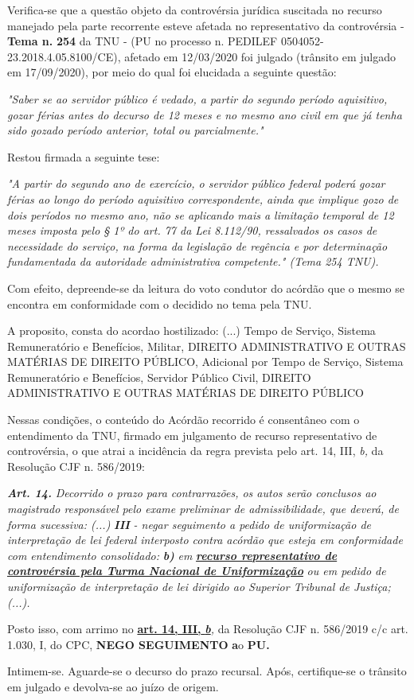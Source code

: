 \documentclass[12pt]{article}
\begin{document}
\justifying
\noindent Verifica-se que a questão objeto da controvérsia jurídica suscitada no recurso manejado pela parte recorrente esteve afetada no representativo da controvérsia - \textbf{Tema n. }\textbf{254} da TNU - (PU no processo n. PEDILEF 0504052-23.2018.4.05.8100/CE),  afetado em 12/03/2020 foi julgado (trânsito em julgado em 17/09/2020), por meio do qual foi elucidada a seguinte questão:

\noindent \textit{"Saber se ao servidor público é vedado, a partir do segundo período aquisitivo, gozar férias antes do decurso de 12 meses e no mesmo ano civil em que já tenha sido gozado período anterior, total ou parcialmente."}

\noindent Restou firmada a seguinte tese:

\noindent \textit{"A partir do segundo ano de exercício, o servidor público federal poderá gozar férias ao longo do período aquisitivo correspondente, ainda que implique gozo de dois períodos no mesmo ano, não se aplicando mais a limitação temporal de 12 meses imposta pelo § 1º do art. 77 da Lei 8.112/90, ressalvados os casos de necessidade do serviço, na forma da legislação de regência e por determinação fundamentada da autoridade administrativa competente." (Tema 254 TNU).}

\noindent Com efeito, depreende-se da leitura do voto condutor do acórdão que o mesmo se encontra em conformidade com o decidido no  tema pela TNU.

\noindent A proposito, consta do acordao hostilizado: (...) Tempo de Serviço, Sistema Remuneratório e Benefícios, Militar, DIREITO ADMINISTRATIVO E OUTRAS MATÉRIAS DE DIREITO PÚBLICO, Adicional por Tempo de Serviço, Sistema Remuneratório e Benefícios, Servidor Público Civil, DIREITO ADMINISTRATIVO E OUTRAS MATÉRIAS DE DIREITO PÚBLICO

\noindent Nessas condições, o conteúdo do Acórdão recorrido é consentâneo com o entendimento da TNU, firmado em julgamento de recurso representativo de controvérsia, o que atrai a incidência da regra prevista pelo art. 14, III, \textit{b,} da Resolução CJF n. 586/2019:

\noindent \textit{\textbf{Art. 14.}}\textit{ Decorrido o prazo para contrarrazões, os autos serão conclusos ao magistrado responsável pelo exame preliminar de admissibilidade, que deverá, de forma sucessiva: (...) }\textit{\textbf{III }}\textit{- negar seguimento a pedido de uniformização de interpretação de lei federal interposto contra acórdão que esteja em conformidade com entendimento consolidado: }\textit{\textbf{b)}}\textit{ em }\uline{\textit{\textbf{recurso representativo de controvérsia pela Turma Nacional de Uniformização}}}\textit{ ou em pedido de uniformização de interpretação de lei dirigido ao Superior Tribunal de Justiça;(...).}

\noindent Posto isso, com arrimo no \uline{\textbf{art. 14, III, }}\uline{\textit{\textbf{b}}}\textit{,} da Resolução CJF n. 586/2019 c/c art. 1.030, I, do CPC, \textbf{NEGO SEGUIMENTO }\textbf{a}o\textbf{ PU}\textbf{.}

\noindent Intimem-se. Aguarde-se o decurso do prazo recursal. Após, certifique-se o trânsito em julgado e devolva-se ao juízo de origem.
\end{document}
